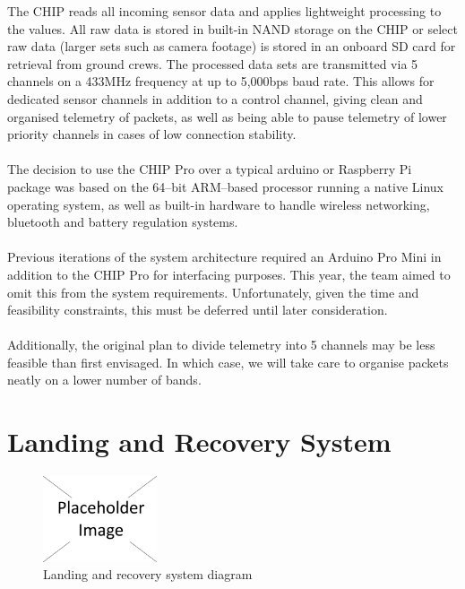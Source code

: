 \documentclass{report}
\begin{document}
		The CHIP reads all incoming sensor data and applies lightweight processing
		to the values. All raw data is stored in built-in NAND storage on the CHIP
		or select raw data (larger sets such as camera footage) is stored in an
		onboard SD card for retrieval from ground crews. The processed data sets 
		are transmitted via 5 channels on a 433MHz frequency at up to 5,000bps
		baud rate. This allows for dedicated sensor channels in addition to a control
		channel, giving clean and organised telemetry of packets, as well as being
		able to pause telemetry of lower priority channels in cases of low 
		connection stability.
		\\\\
		The decision to use the CHIP Pro over a typical arduino or Raspberry Pi
		package was based on the 64--bit ARM--based processor running a 
		native Linux operating system, as well as built-in hardware to handle 
		wireless networking, bluetooth and battery regulation systems.
		\\\\
		{\color{blue}Previous iterations of the system architecture required 
		an Arduino Pro Mini in addition to the CHIP Pro for interfacing purposes.
		This year, the team aimed to omit this from the system requirements.
		Unfortunately, given the time and feasibility constraints, this must be deferred
		until later consideration.
		\\\\
		Additionally, the original plan to divide telemetry into
		5 channels may be less feasible than first envisaged. In which case, we will 
		take care to organise packets neatly on a lower number of bands.
		}

	\section{Landing and Recovery System}

		\begin{figure}
			\vspace{-30pt}
	 		\begin{center}
			\includegraphics[width=0.30\textwidth]{placeholder}
			\end{center}
			\vspace{-15pt}
			\caption[X]{Landing and recovery system diagram}
		\end{figure}
\end{document}
